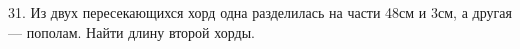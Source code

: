 31. Из двух пересекающихся хорд одна разделилась на части 48см и 3см, а другая --- пополам. Найти длину второй хорды.\\
